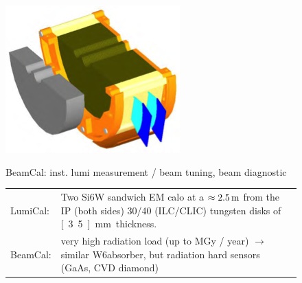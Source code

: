 \begin{figure}
\begin{minipage}{\linewidth}
\begin{minipage}{.25\linewidth}
\includegraphics[width=\textwidth]{Calorimeter/FCAL/BeamCalPic.png}
    \end{minipage}
    \begin{minipage}{.24\linewidth}
        BeamCal: inst. lumi measurement / beam tuning, beam diagnostic
    \end{minipage}
\begin{tabularx}{\textwidth}{lX}
    {\color{red}LumiCal}: & Two Si6W sandwich EM calo at a $\approx\unit[2.5]{m}$ from the IP (both sides) 30/40 (ILC/CLIC) tungsten disks of \unit[3.5]{mm} thickness. \\
    {\color{red}BeamCal}: & very high radiation load (up to \unit[1]{MGy} / year) $\rightarrow$ similar W6absorber, but radiation hard sensors (GaAs, CVD diamond) \\
\end{tabularx}
\end{minipage}
\end{figure}

